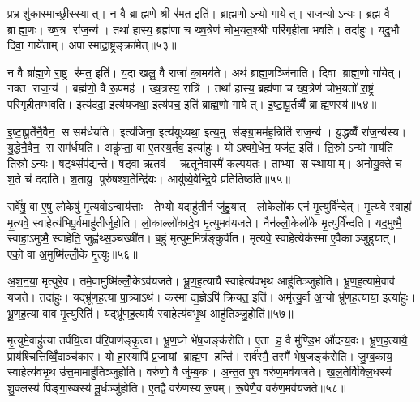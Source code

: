 प्र॒भ्रशु॑कास्मा॒च्छ्रीस्स्यात्। न वै ब्राह्म॒णे श्री र॑मत॒ इति॑। ब्रा॒ह्म॒णोऽन्यो गायेत्। रा॒ज॒न्योऽन्यः। ब्रह्म॒ वै ब्राह्म॒णः। ख्ष॒त्र रा॑ज॒न्य॑। तथा॑ हास्य॒ ब्रह्म॑णा च ख्ष॒त्रेण॑ चोभ॒यत॒श्श्रीः परि॑गृहीता भवति। तदा॑हुः। यदु॒भौ दिवा॒ गाये॑ताम्। अपास्माद्रा॒ष्ट्रङ्क्रा॑मेत्॥५३॥

न वै ब्रा॑ह्म॒णे रा॒ष्ट्र र॑मत॒ इति॑। य॒दा खलु॒ वै राजा॑ का॒मय॑ते। अथ॑ ब्राह्म॒णञ्जि॑नाति। दिवा ब्राह्म॒णो गा॑येत्। नक्त राज॒न्य॑। ब्रह्म॑णो॒ वै रू॒पमह॑। ख्ष॒त्रस्य॒ रात्रि॑। तथा॑ हास्य॒ ब्रह्म॑णा च ख्ष॒त्रेण॑ चोभ॒यतो॑ रा॒ष्ट्रं परि॑गृहीतम्भवति। इत्य॑ददा॒ इत्य॑यजथा॒ इत्य॑पच॒ इति॑ ब्राह्म॒णो गायेत्। इ॒ष्टा॒पू॒र्तव्वैँ ब्राह्म॒णस्य॑॥५४॥

इ॒ष्टा॒पू॒र्तेनै॒वैन॒ स सम॑र्धयति। इत्य॑जिना॒ इत्य॑युध्यथा॒ इत्य॒मु स॑ङ्ग्रा॒मम॑ह॒न्निति॑ राज॒न्य॑। यु॒द्धव्वैँ रा॑ज॒न्य॑स्य। यु॒द्धेनै॒वैन॒ स सम॑र्धयति। अकॢ॑प्ता॒ वा ए॒तस्य॒र्तव॒ इत्या॑हुः। योऽश्वमे॒धेन॒ यज॑त॒ इति॑। ति॒स्रोऽन्यो गाय॑ति ति॒स्रोऽन्यः। षट्थ्संप॑द्यन्ते। षड्वा ऋ॒तव॑। ऋ॒तूने॒वास्मै॑ कल्पयतः। ताभ्या स॒स्थायाम्। अ॒नो॒यु॒क्ते च॑ श॒ते च॑ ददाति। श॒तायु॒ पुरु॑षश्श॒तेन्द्रि॑यः। आयु॑ष्ये॒वेन्द्रि॒ये प्रति॑तिष्ठति॥५५॥\anuvakamend[गाये॑ताङ्क्रामेद्ब्राह्म॒णस्य॑ कल्पयतश्च॒त्वारि॑ च]

सर्वे॑षु॒ वा ए॒षु लो॒केषु॑ मृ॒त्यवो॒ऽन्वाय॑त्ताः। तेभ्यो॒ यदाहु॑ती॒र्न जु॑हु॒यात्। लो॒केलो॑क एनं मृ॒त्युर्वि॑न्देत्। मृ॒त्यवे॒ स्वाहा॑ मृ॒त्यवे॒ स्वाहेत्य॑भिपू॒र्वमाहु॑तीर्जुहोति। लो॒काल्लो॑कादे॒व मृ॒त्युमव॑यजते। नैन॑ल्लोँ॒केलो॑के मृ॒त्युर्वि॑न्दति। यद॒मुष्मै॒ स्वाहा॒ऽमुष्मै॒ स्वाहेति॒ जुह्व॑थ्स॒ञ्चख्षी॑त। ब॒हुं मृ॒त्युम॒मित्र॑ङ्कुर्वीत। मृ॒त्यवे॒ स्वाहेत्येक॑स्मा ए॒वैकाञ्जुहुयात्। एको॒ वा अ॒मुष्मि॑ल्लोँ॒के मृ॒त्युः॥५६॥

अ॒श॒न॒या॒ मृ॒त्युरे॒व। तमे॒वामुष्मि॑ल्लोँ॒केऽव॑यजते। भ्रू॒ण॒ह॒त्यायै स्वाहेत्य॑वभृ॒थ आहु॑तिञ्जुहोति। भ्रू॒ण॒ह॒त्यामे॒वाव॑ यजते। तदा॑हुः। यद्भ्रू॑णह॒त्या पा॒त्र्याऽथ॑। कस्माद्य॒ज्ञेऽपि॑ क्रियत॒ इति॑। अमृ॑त्यु॒र्वा अ॒न्यो भ्रू॑णह॒त्याया॒ इत्या॑हुः। भ्रू॒ण॒ह॒त्या वाव मृ॒त्युरिति॑। यद्भ्रू॑णह॒त्यायै॒ स्वाहेत्य॑वभृ॒थ आहु॑तिञ्जु॒होति॑॥५७॥

मृ॒त्युमे॒वाहु॑त्या तर्पयि॒त्वा प॑रि॒पाण॑ङ्कृ॒त्वा। भ्रू॒ण॒घ्ने भे॑ष॒जङ्क॑रोति। ए॒ता ह॒ वै मु॑ण्डि॒भ औ॑दन्य॒वः। भ्रू॒ण॒ह॒त्यायै॒ प्राय॑श्चित्तिव्विँ॒दाञ्च॑कार। यो हा॒स्यापि॑ प्र॒जायां ब्राह्म॒ण हन्ति॑। सर्व॑स्मै॒ तस्मै॑ भेष॒जङ्क॑रोति। जु॒म्ब॒काय॒ स्वाहेत्य॑वभृ॒थ उ॑त्त॒मामाहु॑तिञ्जुहोति। वरु॑णो॒ वै जु॑म्ब॒कः। अ॒न्त॒त ए॒व वरु॑ण॒मव॑यजते। ख॒ल॒तेर्वि॑क्लि॒धस्य॑ शु॒क्लस्य॑ पिङ्गा॒ख्षस्य॑ मू॒र्धञ्जु॑होति। ए॒तद्वै वरु॑णस्य रू॒पम्। रू॒पेणै॒व वरु॑ण॒मव॑यजते॥५८॥\anuvakamend[लो॒के मृ॒त्युर्जु॒होति॑ मू॒र्धञ्जु॑होति॒ द्वे च॑]

